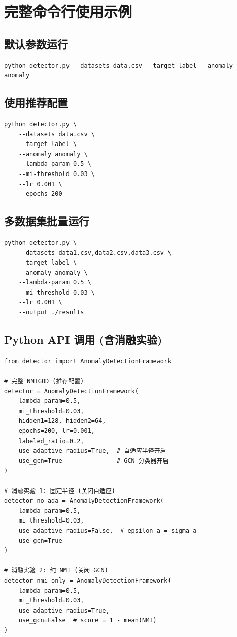 \documentclass[11pt,a4paper]{ctexart}
\begin{document}
\section{完整命令行使用示例}

\subsection{默认参数运行}
\begin{verbatim}
python detector.py --datasets data.csv --target label --anomaly anomaly
\end{verbatim}

\subsection{使用推荐配置}
\begin{verbatim}
python detector.py \
    --datasets data.csv \
    --target label \
    --anomaly anomaly \
    --lambda-param 0.5 \
    --mi-threshold 0.03 \
    --lr 0.001 \
    --epochs 200
\end{verbatim}

\subsection{多数据集批量运行}
\begin{verbatim}
python detector.py \
    --datasets data1.csv,data2.csv,data3.csv \
    --target label \
    --anomaly anomaly \
    --lambda-param 0.5 \
    --mi-threshold 0.03 \
    --lr 0.001 \
    --output ./results
\end{verbatim}

\subsection{Python API 调用 (含消融实验)}
\begin{verbatim}
from detector import AnomalyDetectionFramework

# 完整 NMIGOD (推荐配置)
detector = AnomalyDetectionFramework(
    lambda_param=0.5,
    mi_threshold=0.03,
    hidden1=128, hidden2=64,
    epochs=200, lr=0.001,
    labeled_ratio=0.2,
    use_adaptive_radius=True,  # 自适应半径开启
    use_gcn=True               # GCN 分类器开启
)

# 消融实验 1: 固定半径 (关闭自适应)
detector_no_ada = AnomalyDetectionFramework(
    lambda_param=0.5,
    mi_threshold=0.03,
    use_adaptive_radius=False,  # epsilon_a = sigma_a
    use_gcn=True
)

# 消融实验 2: 纯 NMI (关闭 GCN)
detector_nmi_only = AnomalyDetectionFramework(
    lambda_param=0.5,
    mi_threshold=0.03,
    use_adaptive_radius=True,
    use_gcn=False  # score = 1 - mean(NMI)
)
\end{verbatim}
\end{document}
